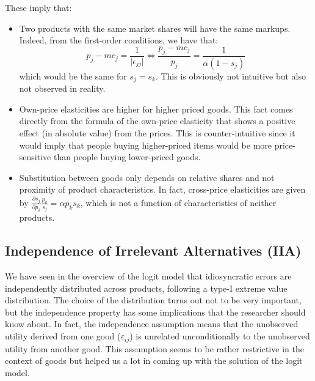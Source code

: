 These imply that:
\begin{itemize}

\item Two products with the same market shares will have the same markups. Indeed, from the first-order conditions, we have that: $$p_j - mc_j = \frac{1}{\vert\epsilon_{jj}\vert} \Leftrightarrow \frac{p_j - mc_j}{p_j} = \frac{1}{\alpha(1 - s_j)} $$ which would be the same for $s_j = s_k$. This is obviously not intuitive but also not observed in reality. 

\item Own-price elasticities are higher for higher priced goods. This fact comes directly from the formula of the own-price elasticity that shows a positive effect (in absolute value) from the prices. This is counter-intuitive since it would imply that people buying higher-priced items would be more price-sensitive than people buying lower-priced goods.

\item Substitution between goods only depends on relative shares and not proximity of product characteristics. In fact, cross-price elasticities are given by $\frac{\partial s_j}{\partial p_k}\frac{p_k}{s_j} = \alpha p_k s_k $, which is not a function of characteristics of neither products.

\end{itemize}

\subsection{Independence of Irrelevant Alternatives (IIA)}\label{sssec:logitiia}

We have seen in the overview of the logit model that idiosyncratic errors are independently distributed across products, following a type-I extreme value distribution. The choice of the distribution turns out not to be very important, but the independence property has some implications that the researcher should know about. In fact, the independence assumption means that the unobserved utility derived from one good ($\varepsilon_{ij}$) is unrelated unconditionally to the unobserved utility from another good. This assumption seems to be rather restrictive in the context of goods but helped us a lot in coming up with the solution of the logit model.

